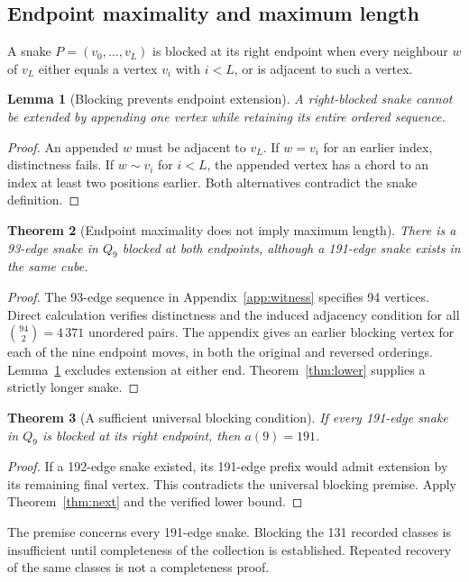 \documentclass[11pt,a4paper]{article}
\newtheorem{theorem}{Theorem}[section]
\newtheorem{lemma}[theorem]{Lemma}
\theoremstyle{definition}
\theoremstyle{remark}
\newcommand{\Q}{Q}
\begin{document}
\subsection{Endpoint maximality and maximum length}
A snake $P=(v_0,\ldots,v_L)$ is blocked at its right endpoint when every neighbour $w$ of $v_L$ either equals a vertex $v_i$ with $i<L$, or is adjacent to such a vertex.
\begin{lemma}[Blocking prevents endpoint extension]\label{lem:block}
A right-blocked snake cannot be extended by appending one vertex while retaining its entire ordered sequence.
\end{lemma}
\begin{proof}
An appended $w$ must be adjacent to $v_L$. If $w=v_i$ for an earlier index, distinctness fails. If $w\sim v_i$ for $i<L$, the appended vertex has a chord to an index at least two positions earlier. Both alternatives contradict the snake definition.
\end{proof}

\begin{theorem}[Endpoint maximality does not imply maximum length]
There is a 93-edge snake in $\Q_9$ blocked at both endpoints, although a 191-edge snake exists in the same cube.
\end{theorem}
\begin{proof}
The 93-edge sequence in Appendix~\ref{app:witness} specifies 94 vertices. Direct calculation verifies distinctness and the induced adjacency condition for all $\binom{94}{2}=4\,371$ unordered pairs. The appendix gives an earlier blocking vertex for each of the nine endpoint moves, in both the original and reversed orderings. Lemma~\ref{lem:block} excludes extension at either end. Theorem~\ref{thm:lower} supplies a strictly longer snake.
\end{proof}

\begin{theorem}[A sufficient universal blocking condition]
If every 191-edge snake in $\Q_9$ is blocked at its right endpoint, then $a(9)=191$.
\end{theorem}
\begin{proof}
If a 192-edge snake existed, its 191-edge prefix would admit extension by its remaining final vertex. This contradicts the universal blocking premise. Apply Theorem~\ref{thm:next} and the verified lower bound.
\end{proof}
The premise concerns every 191-edge snake. Blocking the 131 recorded classes is insufficient until completeness of the collection is established. Repeated recovery of the same classes is not a completeness proof.
\end{document}
